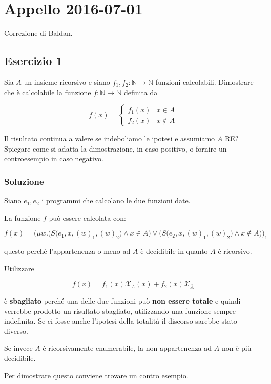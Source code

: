 \section{Appello 2016-07-01}

Correzione di Baldan.

\subsection{Esercizio 1}

Sia $A$ un insieme ricorsivo e siano $f_1, f_2 : \mathbb{N} \rightarrow \mathbb{N}$ funzioni calcolabili. Dimostrare che è calcolabile la funzione $f : \mathbb{N} \rightarrow \mathbb{N}$ definita da

$$
f(x) = \begin{cases}
f_1(x) & x \in A \\
f_2(x) & x \notin A
\end{cases}
$$

Il risultato continua a valere se indeboliamo le ipotesi e assumiamo $A$ RE? Spiegare come si adatta la dimostrazione, in caso positivo, o fornire un controesempio in caso negativo.

\subsubsection{Soluzione}

Siano $e_1, e_2$ i programmi che calcolano le due funzioni date.

La funzione $f$ può essere calcolata con:

$$
f(x) = \Bigg( \mu w. \bigg( S\Big(e_1, x, (w)_1, (w)_2 \Big) \wedge x \in A \bigg) \vee \bigg( S\Big(e_2, x, (w)_1, (w)_2 \Big) \wedge x \notin A \bigg) \Bigg)_1
$$

questo perché l'appartenenza o meno ad $A$ è decidibile in quanto $A$ è ricorsivo.

Utilizzare 

$$
f(x) = f_1(x) \mathcal{X}_A(x) + f_2(x)\mathcal{X}_{\overline{A}}
$$

è \textbf{sbagliato} perché una delle due funzioni può \textbf{non essere totale} e quindi verrebbe prodotto un risultato sbagliato, utilizzando una funzione sempre indefinita. Se ci fosse anche l'ipotesi della totalità il discorso sarebbe stato diverso.

Se invece $A$ è ricorsivamente enumerabile, la non appartenenza ad $A$ non è più decidibile.

Per dimostrare questo conviene trovare un contro esempio.

